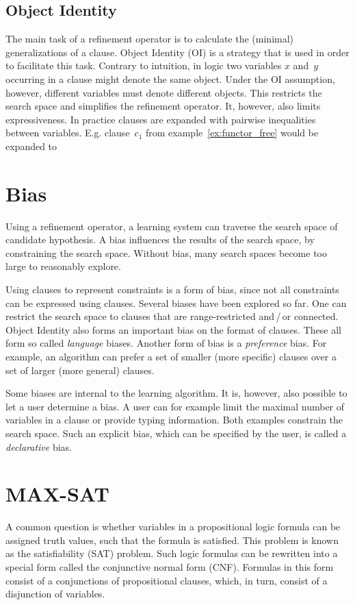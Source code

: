 \subsection{Object Identity}
The main task of a refinement operator is to calculate the (minimal) generalizations of a clause. Object Identity (OI) is a strategy that is used in order to facilitate this task. Contrary to intuition, in logic two variables $x$ and~$y$ occurring in a clause might denote the same object. Under the OI assumption, however, different variables must denote different objects. This restricts the search space and simplifies the refinement operator. It, however, also limits expressiveness. In practice clauses are expanded with pairwise inequalities between variables. E.g. clause~$c_1$ from example~\ref{ex:functor_free} would be expanded to 

\section{Bias}
Using a refinement operator, a learning system can traverse the search space of candidate hypothesis. A bias influences the results of the search space, by constraining the search space. Without bias, many search spaces become too large to reasonably explore.

Using clauses to represent constraints is a form of bias, since not all constraints can be expressed using clauses. Several biases have been explored so far. One can restrict the search space to clauses that are range-restricted and\,/\,or connected. Object Identity also forms an important bias on the format of clauses. These all form so called \textit{language} biases. Another form of bias is a \textit{preference} bias. For example, an algorithm can prefer a set of smaller (more specific) clauses over a set of larger (more general) clauses.

Some biases are internal to the learning algorithm. It is, however, also possible to let a user determine a bias. A user can for example limit the maximal number of variables in a clause or provide typing information. Both examples constrain the search space. Such an explicit bias, which can be specified by the user, is called a \textit{declarative} bias.

\section{MAX-SAT}
\label{sec:max_sat}
A common question is whether variables in a propositional logic formula can be assigned truth values, such that the formula is satisfied.
This problem is known as the satisfiability (SAT) problem.
Such logic formulas can be rewritten into a special form called the conjunctive normal form (CNF).
Formulas in this form consist of a conjunctions of propositional clauses, which, in turn, consist of a disjunction of variables.

